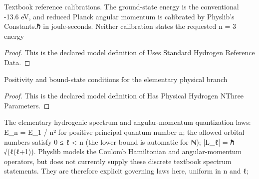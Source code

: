 \begin{definition}
  \label{def:physics:phyx-mini-0620:phyxminiproblems-problemphyxmini0620-usesstandardhydrogenreferencedata}
  Textbook reference calibrations. The ground-state energy is the conventional -13.6 eV, and reduced Planck angular momentum is calibrated by Physlib's Constants.ℏ in joule-seconds. Neither calibration states the requested n = 3 energy
\end{definition}
\begin{proof}
  This is the declared model definition of Uses Standard Hydrogen Reference Data.
\end{proof}
\begin{definition}
  \label{def:physics:phyx-mini-0620:phyxminiproblems-problemphyxmini0620-hasphysicalhydrogennthreeparameters}
  Positivity and bound-state conditions for the elementary physical branch
\end{definition}
\begin{proof}
  This is the declared model definition of Has Physical Hydrogen NThree Parameters.
\end{proof}
\begin{definition}
  \label{def:physics:phyx-mini-0620:phyxminiproblems-problemphyxmini0620-satisfieshydrogenlevelandangularmomentumlaws}
  The elementary hydrogenic spectrum and angular-momentum quantization laws: E\_n = E\_1 / n² for positive principal quantum number n; the allowed orbital numbers satisfy 0 ≤ ℓ < n (the lower bound is automatic for ℕ); |L\_ℓ| = ℏ √(ℓ(ℓ+1)). Physlib models the Coulomb Hamiltonian and angular-momentum operators, but does not currently supply these discrete textbook spectrum statements. They are therefore explicit governing laws here, uniform in n and ℓ;
\end{definition}
